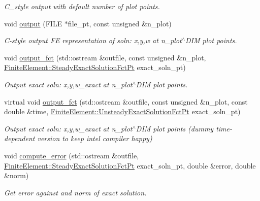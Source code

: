 \begin{DoxyCompactItemize}
\begin{DoxyCompactList}\small\item\em C\+\_\+style output with default number of plot points. \end{DoxyCompactList}\item 
void \hyperlink{classoomph_1_1DisplacementBasedFoepplvonKarmanEquations_ad5c7fa0d55e2eb85d1f305b05be86a97}{output} (F\+I\+LE $\ast$file\+\_\+pt, const unsigned \&n\+\_\+plot)
\begin{DoxyCompactList}\small\item\em C-\/style output FE representation of soln\+: x,y,w at n\+\_\+plot$^\wedge$\+D\+IM plot points. \end{DoxyCompactList}\item 
void \hyperlink{classoomph_1_1DisplacementBasedFoepplvonKarmanEquations_a43085c764ddc4c1b4676b3e89754f87a}{output\+\_\+fct} (std\+::ostream \&outfile, const unsigned \&n\+\_\+plot, \hyperlink{classoomph_1_1FiniteElement_a690fd33af26cc3e84f39bba6d5a85202}{Finite\+Element\+::\+Steady\+Exact\+Solution\+Fct\+Pt} exact\+\_\+soln\+\_\+pt)
\begin{DoxyCompactList}\small\item\em Output exact soln\+: x,y,w\+\_\+exact at n\+\_\+plot$^\wedge$\+D\+IM plot points. \end{DoxyCompactList}\item 
virtual void \hyperlink{classoomph_1_1DisplacementBasedFoepplvonKarmanEquations_a55cc825e8aedbc958617b03dea2afe29}{output\+\_\+fct} (std\+::ostream \&outfile, const unsigned \&n\+\_\+plot, const double \&time, \hyperlink{classoomph_1_1FiniteElement_ad4ecf2b61b158a4b4d351a60d23c633e}{Finite\+Element\+::\+Unsteady\+Exact\+Solution\+Fct\+Pt} exact\+\_\+soln\+\_\+pt)
\begin{DoxyCompactList}\small\item\em Output exact soln\+: x,y,w\+\_\+exact at n\+\_\+plot$^\wedge$\+D\+IM plot points (dummy time-\/dependent version to keep intel compiler happy) \end{DoxyCompactList}\item 
void \hyperlink{classoomph_1_1DisplacementBasedFoepplvonKarmanEquations_a25b1af4abda24f9e3ab73f04c0ded37c}{compute\+\_\+error} (std\+::ostream \&outfile, \hyperlink{classoomph_1_1FiniteElement_a690fd33af26cc3e84f39bba6d5a85202}{Finite\+Element\+::\+Steady\+Exact\+Solution\+Fct\+Pt} exact\+\_\+soln\+\_\+pt, double \&error, double \&norm)
\begin{DoxyCompactList}\small\item\em Get error against and norm of exact solution. \end{DoxyCompactList}\item 

\end{DoxyCompactItemize}
